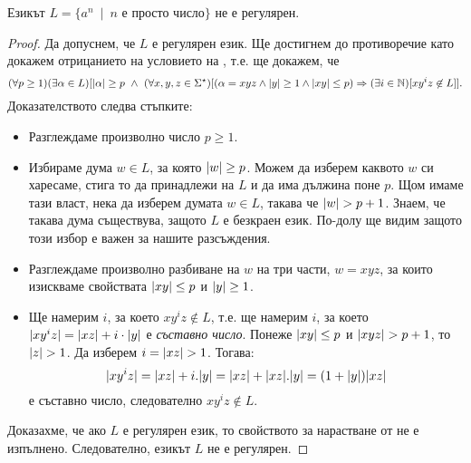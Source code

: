 \begin{example}
  Езикът $L = \{a^n\ \mid\ n\mbox{ е просто число}\}$ не е регулярен.
\end{example}
\begin{proof}
  Да допуснем, че $L$ е регулярен език. Ще достигнем до противоречие като докажем отрицанието на условието на ,
  т.е. ще докажем, че
  {\scriptsize
    \[(\forall p \geq 1)(\exists \alpha \in L)[\lvert{\alpha}\rvert \geq p\ \wedge\ (\forall x,y,z\in\Sigma^\star)[(\alpha = xyz \wedge \lvert{y}\rvert \geq 1\wedge \lvert{xy}\rvert \leq p) \Rightarrow (\exists i\in\mathbb{N})[xy^iz \not\in L]].\]}
  Доказателството следва стъпките:
  \begin{itemize}
  \item 
    Разглеждаме произволно число $p \geq 1$.
  \item
    Избираме дума $w \in L$, за която $\lvert{w}\rvert \geq p$. Можем да изберем каквото $w$ 
    си харесаме, стига то да принадлежи на $L$ и да има дължина поне $p$.
    Щом имаме тази власт, нека да изберем думата $w \in L$, такава че $\lvert{w}\rvert > p+1$.
    Знаем, че такава дума съществува, защото $L$ е безкраен език. По-долу ще видим защото този избор е важен за нашите разсъждения.
  \item
    Разглеждаме произволно разбиване на $w$ на три части, $w = xyz$,
    за които изискваме свойствата $\lvert{xy}\rvert \leq p$ и $\lvert{y}\rvert \geq 1$.
  \item
    Ще намерим $i$, за което $xy^iz \not\in L$,
    т.е. ще намерим $i$, за което 
    $\lvert{xy^iz}\rvert = \lvert{xz}\rvert + i\cdot\lvert{y}\rvert$ е {\em съставно число}.
    Понеже $\lvert{xy}\rvert \leq p$ и $\lvert{xyz}\rvert > p+1$, то $\lvert{z}\rvert > 1$.
    Да изберем $i = \lvert{xz}\rvert > 1$. Тогава:
    \[\lvert{xy^iz}\rvert = \lvert{xz}\rvert + i.\lvert{y}\rvert = \lvert{xz}\rvert + \lvert{xz}\rvert.\lvert{y}\rvert = (1 + \lvert{y}\rvert)\lvert{xz}\rvert\] е съставно число, следователно 
    $xy^iz \not\in L$.
  \end{itemize}
  Доказахме, че ако $L$ е регулярен език, то свойството за нарастване от  не е изпълнено. Следователно, езикът $L$
  не е регулярен.  
\end{proof}

